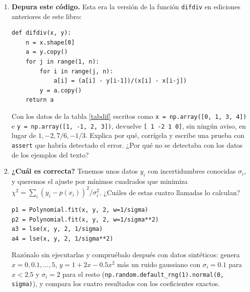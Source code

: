 \begin{enumerate}
\item \label{ej:depura_difdiv} \textbf{Depura este código.} Esta era la versión de la función \texttt{difdiv} en ediciones anteriores de este libro:
\begin{verbatim}
def difdiv(x, y):
    n = x.shape[0]
    a = y.copy()
    for j in range(1, n):
        for i in range(j, n):
            a[i] = (a[i] - y[i-1])/(x[i] - x[i-j])
        y = a.copy()
    return a
\end{verbatim}
Con los datos de la tabla \ref{tabdif} escritos como \texttt{x = np.array([0, 1, 3, 4])} e \texttt{y = np.array([1, -1, 2, 3])}, devuelve \texttt{[ 1 -2  1  0]}, sin ningún aviso, en lugar de $1, -2, 7/6, -1/3$. Explica por qué, corrígela y escribe una prueba con \texttt{assert} que habría detectado el error. ¿Por qué no se detectaba con los datos de los ejemplos del texto?

\item \label{ej:pesos} \textbf{¿Cuál es correcta?} Tenemos unos datos $y_i$ con incertidumbres conocidas $\sigma_i$, y queremos el ajuste por mínimos cuadrados que minimiza $\chi^2=\sum_i (y_i-p(x_i))^2/\sigma_i^2$. ¿Cuáles de estas cuatro llamadas lo calculan?
\begin{verbatim}
p1 = Polynomial.fit(x, y, 2, w=1/sigma)
p2 = Polynomial.fit(x, y, 2, w=1/sigma**2)
a3 = lse(x, y, 2, 1/sigma)
a4 = lse(x, y, 2, 1/sigma**2)
\end{verbatim}
Razónalo sin ejecutarlas y compruébalo después con datos sintéticos: genera $x=0,0.1,\dots,5$, $y=1+2x-0.5x^2$ más un ruido gaussiano con $\sigma_i=0.1$ para $x<2.5$ y $\sigma_i=2$ para el resto (\texttt{np.random.default\_rng(1).normal(0, sigma)}), y compara los cuatro resultados con los coeficientes exactos.


\end{enumerate}
